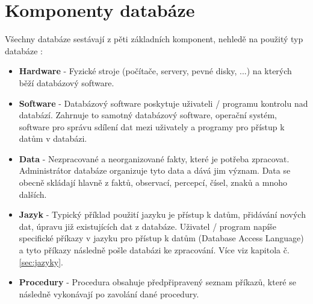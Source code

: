 \section{Komponenty databáze}
Všechny databáze sestávají z pěti základních komponent, nehledě na použitý typ databáze \cite{TechTargetDB, guru99Database}:
\begin{itemize}
\item \textbf{Hardware} - Fyzické stroje (počítače, servery, pevné disky, ...) na kterých běží databázový software.
\item \textbf{Software} - Databázový software poskytuje uživateli / programu kontrolu nad databází. Zahrnuje to samotný databázový software, operační systém, software pro správu sdílení dat mezi uživately a programy pro přístup k datům v databázi.
\item \textbf{Data} - Nezpracované a neorganizované fakty, které je potřeba zpracovat. Administrátor databáze organizuje tyto data a dává jim význam. Data se obecně skládají hlavně z faktů, observací, percepcí, čísel, znaků a mnoho dalších.
\item \textbf{Jazyk} - Typický příklad použití jazyku je přístup k datům, přidávání nových dat, úpravu již existujících dat z databáze. Uživatel / program napíše specifické příkazy v jazyku pro přístup k datům (Database Access Language) a tyto příkazy následně pošle databázi ke zpracování. Více viz kapitola č. \ref{sec:jazyky}.
\item \textbf{Procedury} - Procedura obsahuje předpřipravený seznam příkazů, které se následně vykonávají po zavolání dané procedury. 
\end{itemize}

